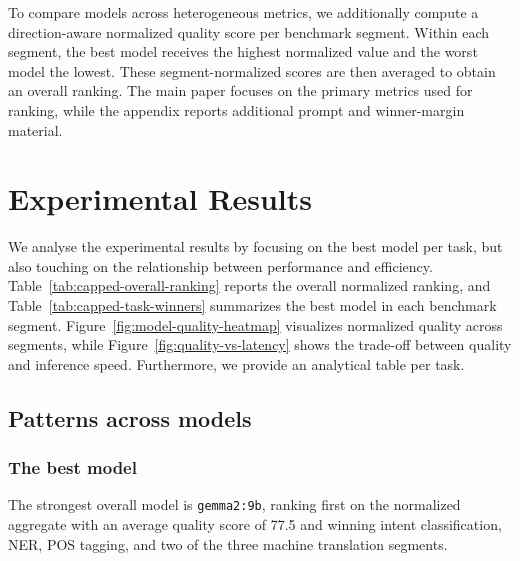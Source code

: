 \documentclass[sigconf,review,anonymous]{acmart}
\begin{document}
To compare models across heterogeneous metrics, we additionally compute a direction-aware normalized quality score per benchmark segment. Within each segment, the best model receives the highest normalized value and the worst model the lowest. These segment-normalized scores are then averaged to obtain an overall ranking. The main paper focuses on the primary metrics used for ranking, while the appendix reports additional prompt and winner-margin material.


\section{Experimental Results}
We analyse the experimental results by focusing on the best model per task, but also touching on the relationship between performance and efficiency. Table~\ref{tab:capped-overall-ranking} reports the overall normalized ranking, and Table~\ref{tab:capped-task-winners} summarizes the best model in each benchmark segment. Figure~\ref{fig:model-quality-heatmap} visualizes normalized quality across segments, while Figure~\ref{fig:quality-vs-latency} shows the trade-off between quality and inference speed. Furthermore, we provide an analytical table per task.

\subsection{Patterns across models}

\subsubsection{The best model} The strongest overall model is \texttt{gemma2:9b}, ranking first on the normalized aggregate with an average quality score of 77.5 and winning intent classification, NER, POS tagging, and two of the three machine translation segments. 
\end{document}
